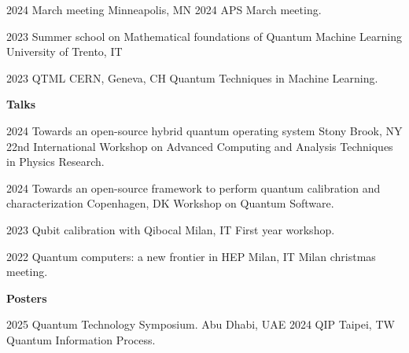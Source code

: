 \documentclass[9pt]{developercv} %
\begin{document}
\begin{entrylist}

    \entry
        {2024}
        {\small{March meeting}}
        {Minneapolis, MN}
        {2024 APS March meeting.}
        {}

    \entry
        {2023}
        {\small{Summer school on Mathematical foundations of Quantum Machine Learning}}
        {University of Trento, IT}
        {}
        {}
         
    \entry
        {2023}
        {\small{QTML}}
        {CERN, Geneva, CH}
        {Quantum Techniques in Machine Learning.}
        {}



\end{entrylist}
\textbf{Talks}\\
\begin{entrylist}
    \entry
        {2024}
        {\small{Towards an open-source hybrid quantum operating system}}
        {Stony Brook, NY}
        {22nd International Workshop on Advanced Computing and Analysis Techniques in Physics Research.}
        {}

    \entry
        {2024}
        {\small{Towards an open-source framework to perform quantum calibration and characterization}}
        {Copenhagen, DK}
        {Workshop on Quantum Software.}
        {}

    \entry
        {2023}
        {\small{Qubit calibration with Qibocal}}
        {Milan, IT}
        {First year workshop.}
        {}

    \entry
        {2022}
        {\small{Quantum computers: a new frontier in HEP}}
        {Milan, IT}
        {Milan christmas meeting.}
        {}
\end{entrylist}

\textbf{Posters}\\
\begin{entrylist}
    \entry
        {2025}
        {\small{Quantum Technology Symposium.}}
        {Abu Dhabi, UAE}
        {}
        {}
    \entry
        {2024}
        {\small{QIP}}
        {Taipei, TW}
        {Quantum Information Process.}
        {}
\end{entrylist}



\end{document}
